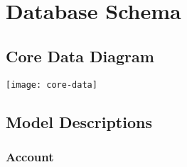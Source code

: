 \section{Database Schema}
\label{sec:database-schema}

\subsection{Core Data Diagram}
\label{sec:core-data-diagram}
\texttt{[image: core-data]}

\subsection{Model Descriptions}
\label{sec:model-descrription}

\subsubsection{Account}
\label{sec:core-data-account}